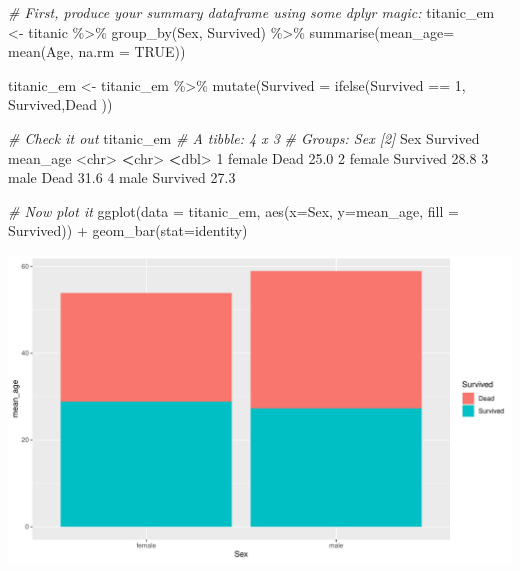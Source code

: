 \documentclass[
]{book}
\newenvironment{Shaded}{\begin{snugshade}}{\end{snugshade}}
\newcommand{\AttributeTok}[1]{\textcolor[rgb]{0.77,0.63,0.00}{#1}}
\newcommand{\CommentTok}[1]{\textcolor[rgb]{0.56,0.35,0.01}{\textit{#1}}}
\newcommand{\ConstantTok}[1]{\textcolor[rgb]{0.00,0.00,0.00}{#1}}
\newcommand{\DecValTok}[1]{\textcolor[rgb]{0.00,0.00,0.81}{#1}}
\newcommand{\ErrorTok}[1]{\textcolor[rgb]{0.64,0.00,0.00}{\textbf{#1}}}
\newcommand{\FloatTok}[1]{\textcolor[rgb]{0.00,0.00,0.81}{#1}}
\newcommand{\FunctionTok}[1]{\textcolor[rgb]{0.00,0.00,0.00}{#1}}
\newcommand{\NormalTok}[1]{#1}
\newcommand{\OtherTok}[1]{\textcolor[rgb]{0.56,0.35,0.01}{#1}}
\newcommand{\SpecialCharTok}[1]{\textcolor[rgb]{0.00,0.00,0.00}{#1}}
\newcommand{\StringTok}[1]{\textcolor[rgb]{0.31,0.60,0.02}{#1}}
\begin{document}
\begin{Shaded}
\begin{Highlighting}[]
\CommentTok{\# First, produce your summary dataframe using some dplyr magic:}
\NormalTok{titanic\_em }\OtherTok{\textless{}{-}}\NormalTok{ titanic }\SpecialCharTok{\%\textgreater{}\%} 
  \FunctionTok{group\_by}\NormalTok{(Sex, Survived) }\SpecialCharTok{\%\textgreater{}\%} 
  \FunctionTok{summarise}\NormalTok{(}\AttributeTok{mean\_age=} \FunctionTok{mean}\NormalTok{(Age, }\AttributeTok{na.rm =} \ConstantTok{TRUE}\NormalTok{))}

\NormalTok{titanic\_em }\OtherTok{\textless{}{-}}\NormalTok{ titanic\_em }\SpecialCharTok{\%\textgreater{}\%} 
  \FunctionTok{mutate}\NormalTok{(}\AttributeTok{Survived =} \FunctionTok{ifelse}\NormalTok{(Survived }\SpecialCharTok{==} \DecValTok{1}\NormalTok{, }\StringTok{\textquotesingle{}Survived\textquotesingle{}}\NormalTok{,}\StringTok{\textquotesingle{}Dead\textquotesingle{}}\NormalTok{ ))}

\CommentTok{\# Check it out}
\NormalTok{titanic\_em}
\CommentTok{\# A tibble: 4 x 3}
\CommentTok{\# Groups:   Sex [2]}
\NormalTok{  Sex    Survived mean\_age}
  \SpecialCharTok{\textless{}}\NormalTok{chr}\SpecialCharTok{\textgreater{}}  \ErrorTok{\textless{}}\NormalTok{chr}\SpecialCharTok{\textgreater{}}       \ErrorTok{\textless{}}\NormalTok{dbl}\SpecialCharTok{\textgreater{}}
\DecValTok{1}\NormalTok{ female Dead         }\FloatTok{25.0}
\DecValTok{2}\NormalTok{ female Survived     }\FloatTok{28.8}
\DecValTok{3}\NormalTok{ male   Dead         }\FloatTok{31.6}
\DecValTok{4}\NormalTok{ male   Survived     }\FloatTok{27.3}

\CommentTok{\# Now plot it}
\FunctionTok{ggplot}\NormalTok{(}\AttributeTok{data =}\NormalTok{ titanic\_em, }
       \FunctionTok{aes}\NormalTok{(}\AttributeTok{x=}\NormalTok{Sex, }\AttributeTok{y=}\NormalTok{mean\_age, }\AttributeTok{fill =}\NormalTok{ Survived)) }\SpecialCharTok{+}
  \FunctionTok{geom\_bar}\NormalTok{(}\AttributeTok{stat=}\StringTok{\textquotesingle{}identity\textquotesingle{}}\NormalTok{)}
\end{Highlighting}
\end{Shaded}

\includegraphics{figures/unnamed-chunk-166-1.pdf}
\end{document}
